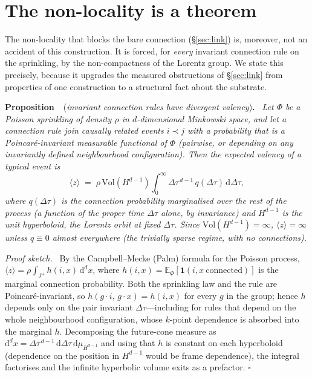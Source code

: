\documentclass[aps,prd,reprint,nofootinbib,superscriptaddress,floatfix]{revtex4-2}
\newcounter{proposition}
\newenvironment{proposition}[1]{\par\medskip\noindent\refstepcounter{proposition}%
\textbf{Proposition~\theproposition}\ (\emph{#1})\textbf{.}\ \itshape}{\par\medskip}
\newenvironment{proofsketch}{\par\noindent\emph{Proof sketch.}\ }{\hfill$\square$\par}
\begin{document}
\section{The non-locality is a theorem}\label{sec:theorem}

The non-locality that blocks the bare connection (\S\ref{sec:link}) is, moreover, not an
accident of this construction. It is forced, for \emph{every} invariant connection rule
on the sprinkling, by the non-compactness of the Lorentz group. We state this precisely,
because it upgrades the measured obstructions of \S\ref{sec:link} from properties of one
construction to a structural fact about the substrate.

\begin{proposition}{invariant connection rules have divergent valency}\label{prop:valency}
Let $\Phi$ be a Poisson sprinkling of density $\rho$ in $d$-dimensional Minkowski space,
and let a connection rule join causally related events $i\prec j$ with a probability
that is a Poincar\'e-invariant measurable functional of $\Phi$ (pairwise, or depending
on any invariantly defined neighbourhood configuration). Then the expected valency of a
typical event is
\begin{equation}
\langle z\rangle \;=\; \rho\,\mathrm{Vol}\!\left(H^{d-1}\right)
\int_0^\infty \Delta\tau^{\,d-1}\, q(\Delta\tau)\,\mathrm{d}\Delta\tau ,
\label{eq:valency}
\end{equation}
where $q(\Delta\tau)$ is the connection probability marginalised over the rest of the
process (a function of the proper time $\Delta\tau$ alone, by invariance) and $H^{d-1}$
is the unit hyperboloid, the Lorentz orbit at fixed $\Delta\tau$. Since
$\mathrm{Vol}(H^{d-1})=\infty$, $\langle z\rangle=\infty$ unless $q\equiv0$ almost
everywhere (the trivially sparse regime, with no connections).
\end{proposition}

\begin{proofsketch}
By the Campbell--Mecke (Palm) formula for the Poisson process,
$\langle z\rangle=\rho\int_{J^+}h(i,x)\,\mathrm{d}^dx$, where
$h(i,x)=\mathbb{E}_\Phi\!\left[\mathbf 1(i,x\ \mathrm{connected})\right]$ is the
marginal connection probability. Both the sprinkling law and the rule are
Poincar\'e-invariant, so $h(g\cdot i,\,g\cdot x)=h(i,x)$ for every $g$ in the group;
hence $h$ depends only on the pair invariant $\Delta\tau$---including for rules that
depend on the whole neighbourhood configuration, whose $k$-point dependence is absorbed
into the marginal $h$. Decomposing the future-cone measure as
$\mathrm{d}^dx=\Delta\tau^{\,d-1}\,\mathrm{d}\Delta\tau\,\mathrm{d}\mu_{H^{d-1}}$ and
using that $h$ is constant on each hyperboloid (dependence on the position in $H^{d-1}$
would be frame dependence), the integral factorises and the infinite hyperbolic volume
exits as a prefactor.
\end{proofsketch}
\end{document}
